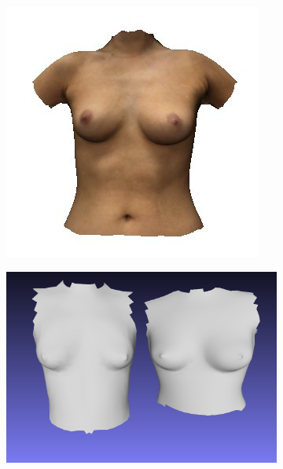 \begin{figure}
\centering
\begin{subfigure}{.22\textwidth}
  \centering
  \includegraphics[width=1.05\linewidth]{figures/sprite57}
\end{subfigure}%
\begin{subfigure}{.38\textwidth}
  \centering
  \includegraphics[width=1\linewidth]{figures/fitted57_cropped}
\end{subfigure}
\begin{subfigure}{.38\textwidth}

\end{subfigure}
\end{figure}
